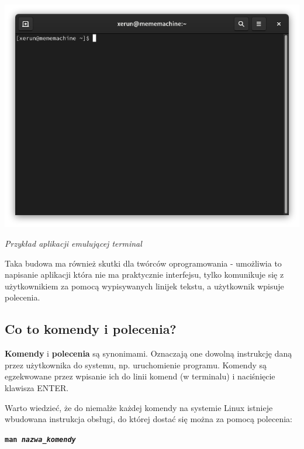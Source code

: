 \documentclass[12pt]{article}
\newcommand{\ttbf}[1]{
    \texttt{\textbf{#1}}
}
\begin{document}
\begin{center}
    \includegraphics[scale=0.5]{przyklad terminal.png}

    \footnotesize
    \emph{Przykład aplikacji emulującej terminal}
    \normalsize
\end{center}

Taka budowa ma również skutki dla twórców oprogramowania - umożliwia to napisanie aplikacji która nie ma praktycznie interfejsu, tylko komunikuje się z użytkownikiem za pomocą wypisywanych linijek tekstu, a użytkownik wpisuje polecenia. 

\subsection{Co to komendy i polecenia?}

\textbf{Komendy} i \textbf{polecenia} są synonimami. Oznaczają one dowolną instrukcję daną przez użytkownika do systemu, np. uruchomienie programu. Komendy są egzekwowane przez wpisanie ich do linii komend (w terminalu) i naciśnięcie klawisza ENTER.

Warto wiedzieć, że do niemalże każdej komendy na systemie Linux istnieje wbudowana instrukcja obsługi, do której dostać się można za pomocą polecenia:

\ttbf{man \emph{nazwa\_komendy}}
\end{document}

